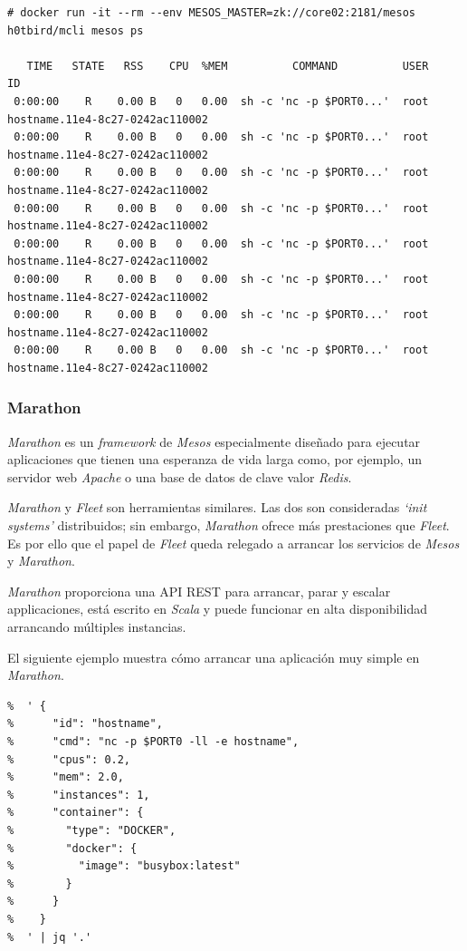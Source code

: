 \documentclass[a4paper,12pt,spanish,final]{epsc_tfc_pfc}
\begin{document}
\begin{lstlisting}[style=dnsmasq]
# docker run -it --rm --env MESOS_MASTER=zk://core02:2181/mesos h0tbird/mcli mesos ps

   TIME   STATE   RSS    CPU  %MEM          COMMAND          USER                        ID
 0:00:00    R    0.00 B   0   0.00  sh -c 'nc -p $PORT0...'  root  hostname.11e4-8c27-0242ac110002
 0:00:00    R    0.00 B   0   0.00  sh -c 'nc -p $PORT0...'  root  hostname.11e4-8c27-0242ac110002
 0:00:00    R    0.00 B   0   0.00  sh -c 'nc -p $PORT0...'  root  hostname.11e4-8c27-0242ac110002
 0:00:00    R    0.00 B   0   0.00  sh -c 'nc -p $PORT0...'  root  hostname.11e4-8c27-0242ac110002
 0:00:00    R    0.00 B   0   0.00  sh -c 'nc -p $PORT0...'  root  hostname.11e4-8c27-0242ac110002
 0:00:00    R    0.00 B   0   0.00  sh -c 'nc -p $PORT0...'  root  hostname.11e4-8c27-0242ac110002
 0:00:00    R    0.00 B   0   0.00  sh -c 'nc -p $PORT0...'  root  hostname.11e4-8c27-0242ac110002
 0:00:00    R    0.00 B   0   0.00  sh -c 'nc -p $PORT0...'  root  hostname.11e4-8c27-0242ac110002
\end{lstlisting}

\subsubsection{Marathon}

\emph{Marathon} es un \emph{framework} de \emph{Mesos} especialmente diseñado para ejecutar aplicaciones que tienen una esperanza de vida larga como, por ejemplo, un servidor web \emph{Apache} o una base de datos de clave valor \emph{Redis}.

\emph{Marathon} y \emph{Fleet} son herramientas similares. Las dos son consideradas \emph{`init systems'} distribuidos; sin embargo, \emph{Marathon} ofrece más prestaciones que \emph{Fleet}. Es por ello que el papel de \emph{Fleet} queda relegado a arrancar los servicios de \emph{Mesos} y \emph{Marathon}.

\emph{Marathon} proporciona una API REST para arrancar, parar y escalar applicaciones, está escrito en \emph{Scala} y puede funcionar en alta disponibilidad arrancando múltiples instancias.

El siguiente ejemplo muestra cómo arrancar una aplicación muy simple en \emph{Marathon}.\\

\begin{lstlisting}[style=dnsmasq]
%curl -s -H "Content-Type: application/json" http://core01:8080/v2/apps -d \
%  ' {
%      "id": "hostname",
%      "cmd": "nc -p $PORT0 -ll -e hostname",
%      "cpus": 0.2,
%      "mem": 2.0,
%      "instances": 1,
%      "container": {
%        "type": "DOCKER",
%        "docker": {
%          "image": "busybox:latest"
%        }
%      }
%    }
%  ' | jq '.'
\end{lstlisting}
\end{document}
